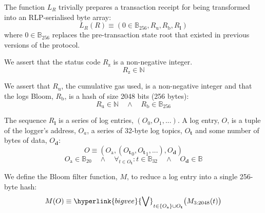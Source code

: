 \documentclass[9pt,oneside]{amsart}
\makeatletter
\newcommand{\linkdest}[1]{\Hy@raisedlink{\hypertarget{#1}{}}}
\makeatother
\begin{document}
\begin{multicols}{2}
\hypertarget{transaction_receipt_preparation_function_for_RLP_serialisation}{}\linkdest{L__R}The function $L_{R}$ trivially prepares a transaction receipt for being transformed into an RLP-serialised byte array:
\begin{equation}
L_{R}(R) \equiv (0 \in \mathbb{B}_{256}, R_{\mathrm{u}}, R_{\mathrm{b}}, R_{\mathbf{l}})
\end{equation}
where $0 \in \mathbb{B}_{256}$ replaces the pre-transaction state root that existed in previous versions of the protocol.

\linkdest{R__z_assert}We assert that the status code $R_{\mathrm{z}}$ is a non-negative integer.
\begin{equation}
R_{\mathrm{z}} \in \mathbb{N}
\end{equation}

\linkdest{R__u_assert}We assert that $R_{\mathrm{u}}$, the cumulative gas used, is a non-negative integer and that the logs Bloom, $R_{\mathrm{b}}$, is a hash of size 2048 bits (256 bytes):
\begin{equation}
R_{\mathrm{u}} \in \mathbb{N} \quad \wedge \quad R_{\mathrm{b}} \in \mathbb{B}_{256}
\end{equation}


The sequence $R_{\mathbf{l}}$ is a series of log entries, $(O_0, O_1, ...)$. A log entry, $O$, is a tuple of the logger's address, $O_a$, a series of 32-byte log topics, $O_{\mathbf{t}}$ and some number of bytes of data, $O_{\mathbf{d}}$:
\begin{equation}
O \equiv (O_{\mathrm{a}}, ({O_{\mathbf{t}}}_0, {O_{\mathbf{t}}}_1, ...), O_{\mathbf{d}})
\end{equation}
\begin{equation}
O_{\mathrm{a}} \in \mathbb{B}_{20} \quad \wedge \quad \forall_{t \in O_{\mathbf{t}}}: t \in \mathbb{B}_{32} \quad \wedge \quad O_{\mathbf{d}} \in \mathbb{B}
\end{equation}

We define the Bloom filter function, $M$, to reduce a log entry into a single 256-byte hash:
\begin{equation}
M(O) \equiv \hyperlink{bigvee}{\bigvee}_{t \in \{O_{\mathrm{a}}\} \cup O_{\mathbf{t}}} \big( M_{3:2048}(t) \big)
\end{equation}


\end{multicols}
\end{document}
